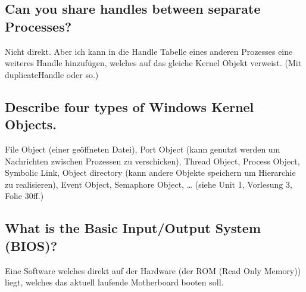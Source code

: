 \subsection{Can you share handles between separate Processes?}
Nicht direkt. Aber ich kann in die Handle Tabelle eines anderen Prozesses eine weiteres Handle hinzufügen, welches auf das gleiche Kernel Objekt verweist.
(Mit duplicateHandle oder so.)

\subsection{Describe four types of Windows Kernel Objects.}
File Object (einer geöffneten Datei), Port Object (kann genutzt werden um Nachrichten zwischen Prozessen zu verschicken), Thread Object, Process Object, Symbolic Link, Object directory (kann andere Objekte speichern um Hierarchie zu realisieren), Event Object, Semaphore Object, \dots
(siehe Unit 1, Vorlesung 3, Folie 30ff.)

\subsection{What is the Basic Input/Output System (BIOS)?}
Eine Software welches direkt auf der Hardware (der ROM (Read Only Memory)) liegt, welches das aktuell laufende Motherboard booten soll.
